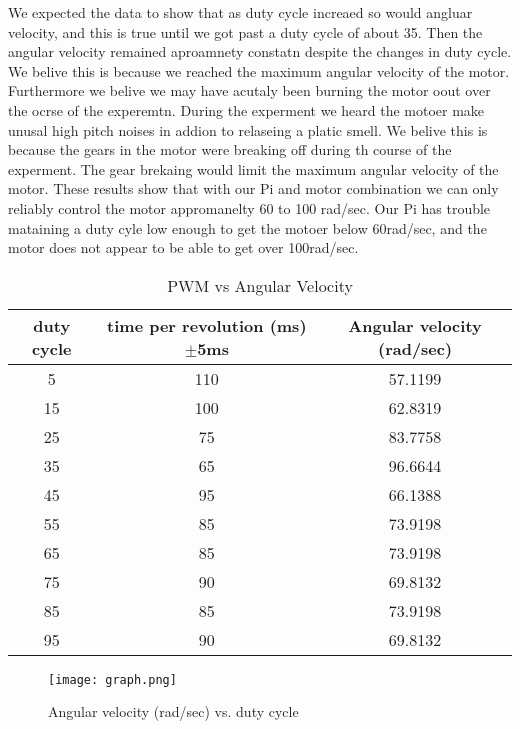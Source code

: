 \documentclass[prl,12pt,notitlepage,aps,onecolumn,superscriptaddress]{revtex4-1}
\begin{document}
We expected the data to show that as duty cycle increaed so would angluar velocity, and this is true until we got past a duty cycle of about 35. Then the angular velocity remained aproamnety constatn despite the changes in duty cycle. We belive this is because we reached the maximum angular velocity of the motor. Furthermore we belive we may have acutaly been burning the motor oout over the ocrse of the experemtn. During the experment we heard the motoer make unusal high pitch noises in addion to relaseing a platic smell. We belive this is because the gears in the motor were breaking off during th course of the experment. The gear brekaing would limit the maximum angular velocity of the motor. These results show that with our Pi and motor combination we can only reliably control the motor appromanelty 60 to 100 rad/sec. Our Pi has trouble mataining a duty cyle low enough to get the motoer below 60rad/sec, and the motor does not appear to be able to get over 100rad/sec.

\begin{table}[h]
  \centering
  \caption{PWM vs Angular Velocity}
    \begin{tabular}{c|c|c}
    \toprule
    duty cycle & time per revolution (ms) $\pm$5ms & Angular velocity (rad/sec) \\
    \midrule
    5     & 110   & 57.1199 \\
    15    & 100   & 62.8319 \\
    25    & 75    & 83.7758 \\
    35    & 65    & 96.6644 \\
    45    & 95    & 66.1388 \\
    55    & 85    & 73.9198 \\
    65    & 85    & 73.9198 \\
    75    & 90    & 69.8132 \\
    85    & 85    & 73.9198 \\
    95    & 90    & 69.8132 \\
    \bottomrule
    \end{tabular}%
  \label{tab:addlabel}%
\end{table}%

\begin{figure}[h]
\begin{center}
\texttt{[image: graph.png]}
\end{center}
\caption{\label{fig:pic} Angular velocity (rad/sec) vs. duty cycle }
\end{figure}
\end{document}
